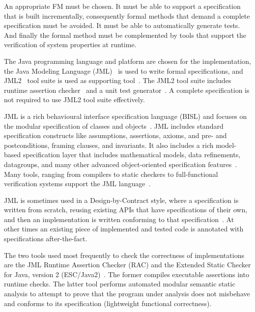 \documentclass[english]{lni}
\begin{document}
An appropriate FM must be chosen.  
It must be able to support a specification that is built incrementally, consequently formal methods that demand a complete specification must be avoided.
It must be able to automatically generate tests.
And finally the formal method must be complemented by tools that support the verification of system properties at runtime.

The Java programming language and platform are chosen for the implementation, the Java Modeling Language (JML)~\cite{LeavensBakerRuby-Prelim} is used to write formal specifications, and JML2~\cite{JML2} tool suite is used as supporting tool~\cite{BurdyEtal05-STTT}.  
The JML2 tool suite includes runtime assertion checker~\cite{Cheon-Leavens02b} and a unit test generator~\cite{Cheon2002}.
A complete specification is not required to use JML2 tool suite effectively.

JML is a rich behavioural interface specification language (BISL) and focuses on the modular specification of classes and objects~\cite{LeavensBakerRuby99}.  
JML includes standard specification constructs like assumptions, assertions, axioms, and pre- and postconditions, framing clauses, and invariants.
It also includes a rich model-based specification layer that includes mathematical models, data refinements, datagroups, and many other advanced object-oriented specification features~\cite{Chalin06}.  
Many tools, ranging from compilers to static checkers to full-functional verification systems support the JML language~\cite{BurdyEtal05-STTT}.

JML is sometimes used in a Design-by-Contract style, where a specification is written from scratch, reusing existing APIs that have
specifications of their own, and then an implementation is written conforming to that specification~\cite{Meyer92b}.  
At other times an existing piece of implemented and tested code is annotated with specifications after-the-fact.

The two tools used most frequently to check the correctness of implementations are the JML Runtime Assertion Checker (RAC) and the
Extended Static Checker for Java, version 2 (ESC/Java2)~\cite{Cheon-Leavens02b,BurdyEtal05-STTT,KiniryCok04}.  
The former compiles executable assertions into runtime checks.  
The latter tool performs automated modular semantic static analysis to attempt to prove that the program under analysis does not misbehave and conforms to its specification (lightweight functional correctness).  
\end{document}
